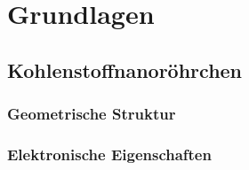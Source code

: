 \chapter{Grundlagen}
\label{cha:grundlagen}

\section{Kohlenstoffnanoröhrchen}
\label{cha:kohlenstoffnanoroehrchen}



\subsection{Geometrische Struktur}
\label{geometrischestruktur}

\subsection{Elektronische Eigenschaften}
\label{elektronischeeigenschaften}